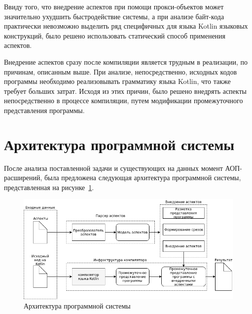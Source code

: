 Ввиду того, что внедрение аспектов при помощи прокси-объектов может значительно
ухудшить быстродействие системы, а при анализе байт-кода практически невозможно выделить ряд специфичных для языка Kotlin языковых конструкций, было решено использовать статический способ применения аспектов.

Внедрение аспектов сразу после компиляции является трудным в реализации, по
причинам, описанным выше.
При анализе, непосредственно, исходных кодов программы необходимо реализовывать
грамматику языка Kotlin, что также требует больших затрат.
Исходя из этих причин, было решено внедрять аспекты непосредственно в процессе
компиляции, путем модификации промежуточного представления программы.
\section{Архитектура программной системы}
\label{sec:prototype_structure}
После анализа поставленной задачи и существующих на данных момент
АОП-расширений, была предложена следующая архитектура программной системы,
представленная на рисунке~\ref{fig:program_architecture}.

\begin{figure}[htbp]
\centering
\includegraphics[width=\textwidth]{fig/program_architecture}
\caption{Архитектура программной системы}%
\label{fig:program_architecture}
\end{figure}

